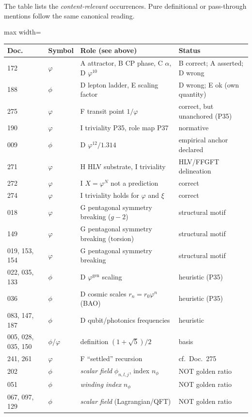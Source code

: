 The table lists the \emph{content-relevant} occurrences. Pure definitional or
pass-through mentions follow the same canonical reading.

\begin{center}
\begin{adjustbox}{max width=\textwidth}
\begin{tabular}{l l l l}
\hline
\textbf{Doc.} & \textbf{Symbol} & \textbf{Role (see above)} & \textbf{Status} \\
\hline
172 & $\varphi$ & A attractor, B CP phase, C $\alpha$, D $\varphi^{10}$ & B correct; A asserted; D wrong \\
188 & $\phi$ & D lepton ladder, E scaling factor & D wrong; E ok (own quantity) \\
275 & $\varphi$ & F transit point $1/\varphi$ & correct, but unanchored (P35) \\
190 & $\varphi$ & I triviality P35, role map P37 & normative \\
009 & $\phi$ & D $\varphi^{12}/1.314$ & empirical anchor declared \\
271 & $\varphi$ & H HLV substrate, I triviality & HLV/FFGFT delineation \\
272 & $\varphi$ & I $X=\varphi^N$ not a prediction & correct \\
274 & $\varphi$ & I triviality holds for $\varphi$ and $\xi$ & correct \\
018 & $\varphi$ & G pentagonal symmetry breaking ($g{-}2$) & structural motif \\
149 & $\varphi$ & G pentagonal symmetry breaking (torsion) & structural motif \\
019, 153, 154 & $\varphi$ & G pentagonal symmetry breaking & structural motif \\
022, 035, 133 & $\phi$ & D $\varphi^{\text{gen}}$ scaling & heuristic (P35) \\
036 & $\phi$ & D cosmic scales $r_n=r_0\varphi^n$ (BAO) & heuristic (P35) \\
083, 147, 187 & $\phi$ & D qubit/photonics frequencies & heuristic \\
005, 028, 035, 150 & $\phi$/$\varphi$ & definition $(1+\sqrt5)/2$ & basis \\
241, 261 & $\varphi$ & F ``settled'' recursion & cf.\ Doc.~275 \\
\hline
202 & $\phi$ & \emph{scalar field} $\phi_{n,l,j}$, index $n_\phi$ & NOT golden ratio \\
051 & $\phi$ & \emph{winding index} $n_\phi$ & NOT golden ratio \\
067, 097, 129 & $\phi$ & \emph{scalar field} (Lagrangian/QFT) & NOT golden ratio \\
\hline
\end{tabular}
\end{adjustbox}
\end{center}

